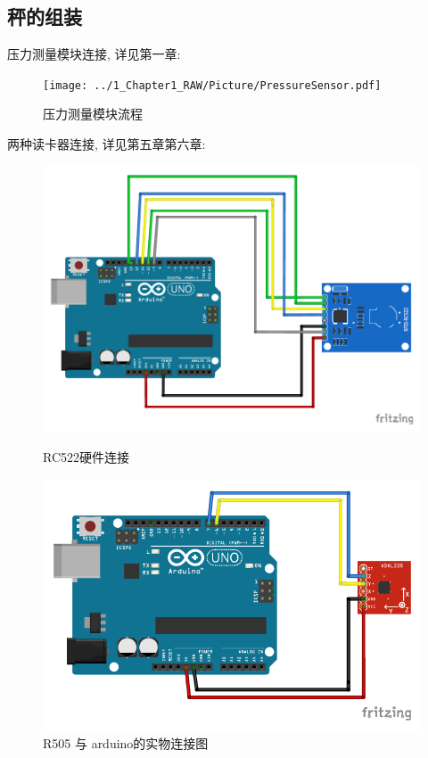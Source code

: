 \documentclass{article}
\begin{document}
\subsection{秤的组装}
压力测量模块连接, 详见第一章:
\begin{figure}[h]
	\centering
	\texttt{[image: ../1\_Chapter1\_RAW/Picture/PressureSensor.pdf]}
	\caption{压力测量模块流程}
	\label{fig:压力测量模块流程图}
	\hfill
\end{figure}
		
两种读卡器连接, 详见第五章第六章:
\begin{figure}[h]
	\centering
	\begin{minipage}{.45\textwidth}
		\centering
		\includegraphics[width=\linewidth]{../5_Chapter5_RC522/Picture/RFID_RC522.pdf}
		\caption{RC522硬件连接}
		\label{fig:RC522硬件连接}
	\end{minipage}%
	\hfill
  \begin{minipage}{.45\textwidth}
		\centering
		\includegraphics[width=\linewidth]{../6_Chapter6_UHF_R505/Picture/R505.pdf}
		\caption{R505 与 arduino的实物连接图}
		\label{fig:R505 与 arduino的实物连接图}
	\end{minipage}
\end{figure}
\end{document}
